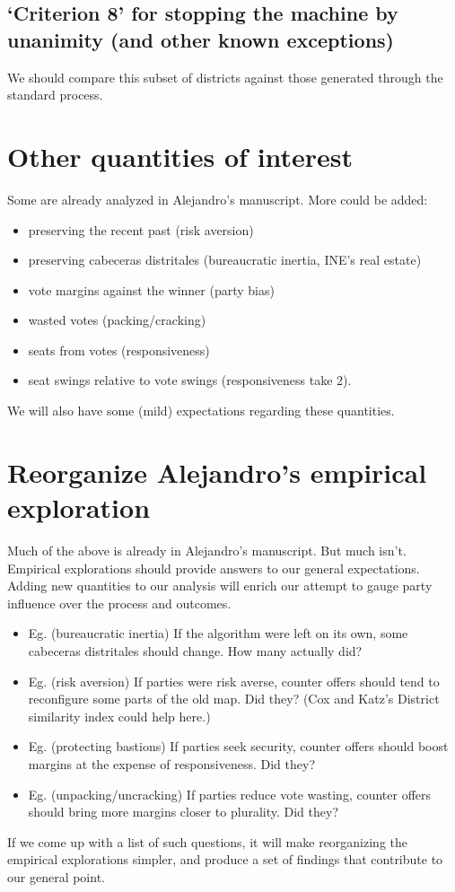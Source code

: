 \documentclass[12pt]{article}
\begin{document}
\subsection{`Criterion 8' for stopping the machine by unanimity (and other known exceptions)}
\label{sec:org04bf28f}
We should compare this subset of districts against those generated through the standard process.
\section{Other quantities of interest}
\label{sec:orgc56c7da}
Some are already analyzed in Alejandro's manuscript. More could be added:
\begin{itemize}
\item preserving the recent past (risk aversion)
\item preserving cabeceras distritales (bureaucratic inertia, INE's real estate)
\item vote margins against the winner (party bias)
\item wasted votes (packing/cracking)
\item seats from votes (responsiveness)
\item seat swings relative to vote swings (responsiveness take 2).
\end{itemize}
We will also have some (mild) expectations regarding these quantities.
\section{Reorganize Alejandro's empirical exploration}
\label{sec:org4b5bb81}
Much of the above is already in Alejandro's manuscript. But much isn't. Empirical explorations should provide answers to our general expectations. Adding new quantities to our analysis will enrich our attempt to gauge party influence over the process and outcomes. 
\begin{itemize}
\item Eg. (bureaucratic inertia) If the algorithm were left on its own, some cabeceras distritales should change. How many actually did?
\item Eg. (risk aversion) If parties were risk averse, counter offers should tend to reconfigure some parts of the old map. Did they? (Cox and Katz's District similarity index could help here.)
\item Eg. (protecting bastions) If parties seek security, counter offers should boost margins at the expense of responsiveness. Did they?
\item Eg. (unpacking/uncracking) If parties reduce vote wasting, counter offers should bring more margins closer to plurality. Did they?
\end{itemize}
If we come up with a list of such questions, it will make reorganizing the empirical explorations simpler, and produce a set of findings that contribute to our general point. 
\end{document}
